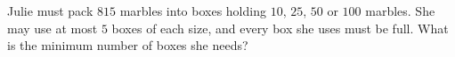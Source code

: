 Julie must pack $815$ marbles into boxes holding $10$, $25$, $50$ or $100$ marbles. She may use at most $5$ boxes of each size, and every box she uses must be full. What is the minimum number of boxes she needs?
